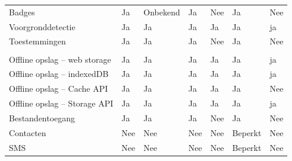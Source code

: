 \begin{table}[]
\begin{tabular}{p{6cm}p{13mm}p{15mm}p{13mm}p{13mm}p{13mm}p{13mm}}
			   Badges & \cellcolor{green!40} Ja  & \cellcolor{orange!50} Onbekend & \cellcolor{green!40} Ja & \cellcolor{red!50} Nee  & \cellcolor{green!40} Ja & \cellcolor{red!50} Nee \\
			   
			   Voorgronddetectie & \cellcolor{green!40} Ja  & \cellcolor{green!40} Ja & \cellcolor{green!40} Ja  & \cellcolor{green!40} Ja & \cellcolor{green!40} Ja & \cellcolor{green!40} ja \\
			   
			   Toestemmingen & \cellcolor{green!40} Ja  & \cellcolor{green!40} Ja & \cellcolor{green!40} Ja & \cellcolor{red!50} Nee  & \cellcolor{green!40} Ja & \cellcolor{red!50} Nee \\
			   
			   &  & &  &  &  &  \\
			   
			   Offline opslag – web storage & \cellcolor{green!40} Ja  & \cellcolor{green!40} Ja & \cellcolor{green!40} Ja  & \cellcolor{green!40} Ja & \cellcolor{green!40} Ja & \cellcolor{green!40} ja \\
			   
			   Offline opslag – indexedDB & \cellcolor{green!40} Ja  & \cellcolor{green!40} Ja & \cellcolor{green!40} Ja  & \cellcolor{green!40} Ja & \cellcolor{green!40} Ja & \cellcolor{green!40} ja \\
			   
			   Offline opslag – Cache API & \cellcolor{green!40} Ja  & \cellcolor{green!40} Ja & \cellcolor{green!40} Ja  & \cellcolor{green!40} Ja & \cellcolor{green!40} Ja & \cellcolor{red!50} Nee\\
			   
			   Offline opslag – Storage API & \cellcolor{green!40} Ja  & \cellcolor{green!40} Ja & \cellcolor{green!40} Ja  & \cellcolor{green!40} Ja & \cellcolor{green!40} Ja & \cellcolor{green!40} ja \\
			   
			   Bestandentoegang & \cellcolor{green!40} Ja  & \cellcolor{green!40} Ja & \cellcolor{green!40} Ja & \cellcolor{red!50} Nee  & \cellcolor{green!40} Ja & \cellcolor{red!50} Nee \\
			   
			   Contacten &  \cellcolor{red!50} Nee  &  \cellcolor{red!50} Nee &  \cellcolor{red!50} Nee  & \cellcolor{red!50} Nee &  \cellcolor{orange!50} Beperkt &  \cellcolor{red!50} Nee \\
			   
			   SMS &  \cellcolor{red!50} Nee  &  \cellcolor{red!50} Nee &  \cellcolor{red!50} Nee  & \cellcolor{red!50} Nee &  \cellcolor{orange!50} Beperkt &  \cellcolor{red!50} Nee \\
			   

\end{tabular}
\end{table}
